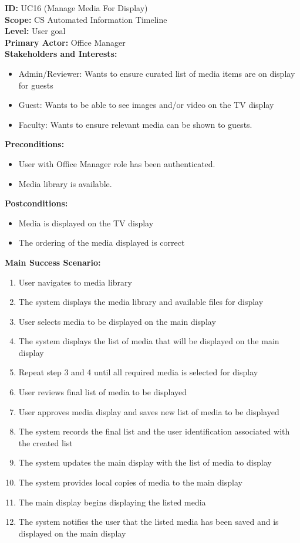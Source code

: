 \textbf{ID:} UC16 (Manage Media For Display) \\
\textbf{Scope:} CS Automated Information Timeline \\
\textbf{Level:} User goal \\
\textbf{Primary Actor:} Office Manager \\
\textbf{Stakeholders and Interests:}
\begin{itemize}
    \item Admin/Reviewer: Wants to ensure curated list of media items are on display for guests
    \item Guest: Wants to be able to see images and/or video on the TV display
    \item Faculty: Wants to ensure relevant media can be shown to guests.
\end{itemize}
\textbf{Preconditions:}
\begin{itemize}
    \item User with Office Manager role has been authenticated.
    \item Media library is available.
\end{itemize}
\textbf{Postconditions:}
\begin{itemize}
    \item Media is displayed on the TV display
    \item The ordering of the media displayed is correct
\end{itemize}
\textbf{Main Success Scenario:}
\begin{enumerate}
    \item User navigates to media library
    \item The system displays the media library and available files for display
    \item User selects media to be displayed on the main display
    \item The system displays the list of media that will be displayed on the main display
    \item Repeat step 3 and 4 until all required media is selected for display
    \item User reviews final list of media to be displayed
    \item User approves media display and saves new list of media to be displayed
    \item The system records the final list and the user identification associated with the created list
    \item The system updates the main display with the list of media to display
    \item The system provides local copies of media to the main display
    \item The main display begins displaying the listed media
    \item The system notifies the user that the listed media has been saved and is displayed on the main display
\end{enumerate}
